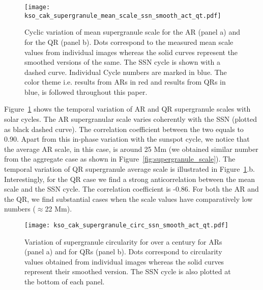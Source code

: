 \documentclass[manuscript]{aastex}	%
\begin{document}
  \begin{figure}[!htbp]
  \centering
  \texttt{[image: kso\_cak\_supergranule\_mean\_scale\_ssn\_smooth\_act\_qt.pdf]}
  \vspace{-.05\textwidth}
  \caption{Cyclic variation of mean supergranule scale for the AR (panel a) and for the QR (panel b). Dots correspond to the measured mean scale values from individual images whereas the solid curves represent the smoothed versions of the same. The SSN cycle is shown with a dashed curve. Individual Cycle numbers are marked in blue. The color theme i.e. results from ARs in red and results from QRs in blue, is followed throughout this paper.}
  \label{fig:supergranule_scale_act_qt}
\end{figure}

 Figure~\ref{fig:supergranule_scale_act_qt} shows the temporal variation of AR and QR supergranule scales with solar cycles. The AR supergranular scale varies coherently with the SSN (plotted as black dashed curve). The correlation coefficient between the two equals to 0.90. Apart from this in-phase variation with the sunspot cycle, we notice that the average AR scale, in this case, is around 25 $\mathrm{Mm}$ (we obtained similar number from the aggregate case as shown in Figure~\ref{fig:supergranule_scale}). The temporal variation of QR supergranule average scale is illustrated in Figure~\ref{fig:supergranule_scale_act_qt}.b. Interestingly, for the QR case we find a strong anticorrelation between the mean scale and the SSN cycle. The correlation coefficient is -0.86. For both the AR and the QR, we find substantial cases when the scale values have comparatively low numbers ($\approx$22 $\mathrm{Mm}$).

  \begin{figure}[!htbp]
  \centering
  \texttt{[image: kso\_cak\_supergranule\_circ\_ssn\_smooth\_act\_qt.pdf]}
  \vspace{-.1\textwidth}
  \caption{Variation of supergranule circularity for over a century for ARs (panel a) and for QRs (panel b). Dots correspond to circularity values obtained from individual images whereas the solid curves represent their smoothed version. The SSN cycle is also plotted at the bottom of each panel.}
 \label{fig:supergranule_circ_qt_act}
\end{figure}
\end{document}
